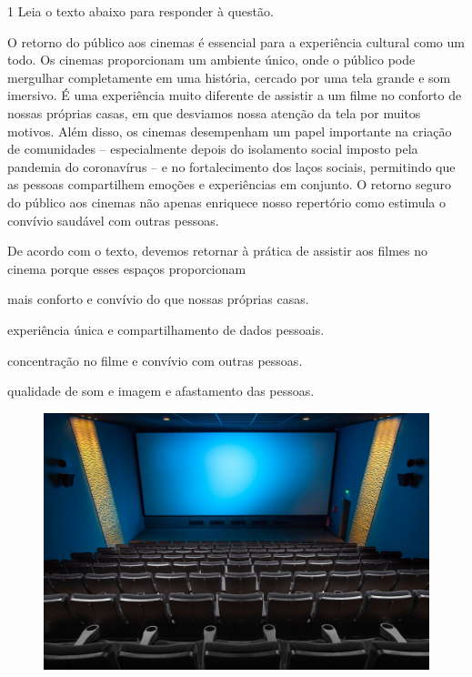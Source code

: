 \num{1} Leia o texto abaixo para responder à questão.

\begin{myquote}
O retorno do público aos cinemas é essencial para a experiência cultural como
um todo. Os cinemas proporcionam um ambiente único, onde o público pode
mergulhar completamente em uma história, cercado por uma tela grande e som
imersivo. É uma experiência muito diferente de assistir a um filme 
no conforto de nossas próprias casas, em que desviamos nossa atenção da tela 
por muitos motivos. Além disso, os cinemas desempenham um papel importante 
na criação de comunidades -- especialmente depois do isolamento social imposto 
pela pandemia do coronavírus -- e no fortalecimento dos laços sociais, permitindo 
que as pessoas compartilhem emoções e experiências em conjunto. O retorno seguro 
do público aos cinemas não apenas enriquece nosso repertório como estimula o convívio
saudável com outras pessoas.


\end{myquote}

De acordo com o texto, devemos retornar à prática de assistir aos filmes 
no cinema porque esses espaços proporcionam

\begin{escolha}

  \item mais conforto e convívio do que nossas próprias casas.

  \item experiência única e compartilhamento de dados pessoais. 

  \item concentração no filme e convívio com outras pessoas.

  \item qualidade de som e imagem e afastamento das pessoas. 

\end{escolha}

\begin{figure}[htpb!]
\centering
\includegraphics[width=\textwidth]{./imgSAEB_7_POR/media/image42.png}
\end{figure}

